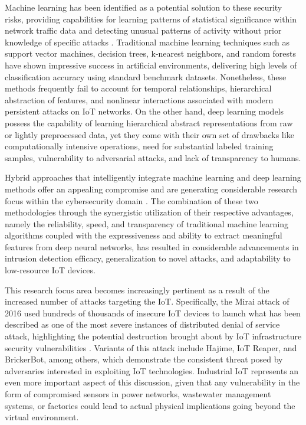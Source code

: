 \documentclass[12pt]{article}
\begin{document}
Machine learning has been identified as a potential solution to these security risks, providing capabilities for learning patterns of statistical significance within network traffic data and detecting unusual patterns of activity without prior knowledge of specific attacks \cite{hasan2019attack}. Traditional machine learning techniques such as support vector machines, decision trees, k-nearest neighbors, and random forests have shown impressive success in artificial environments, delivering high levels of classification accuracy using standard benchmark datasets. Nonetheless, these methods frequently fail to account for temporal relationships, hierarchical abstraction of features, and nonlinear interactions associated with modern persistent attacks on IoT networks. On the other hand, deep learning models possess the capability of learning hierarchical abstract representations from raw or lightly preprocessed data, yet they come with their own set of drawbacks like computationally intensive operations, need for substantial labeled training samples, vulnerability to adversarial attacks, and lack of transparency to humans.

Hybrid approaches that intelligently integrate machine learning and deep learning methods offer an appealing compromise and are generating considerable research focus within the cybersecurity domain \cite{zhang2019hybrid}. The combination of these two methodologies through the synergistic utilization of their respective advantages, namely the reliability, speed, and transparency of traditional machine learning algorithms coupled with the expressiveness and ability to extract meaningful features from deep neural networks, has resulted in considerable advancements in intrusion detection efficacy, generalization to novel attacks, and adaptability to low-resource IoT devices.

This research focus area becomes increasingly pertinent as a result of the increased number of attacks targeting the IoT. Specifically, the Mirai attack of 2016 used hundreds of thousands of insecure IoT devices to launch what has been described as one of the most severe instances of distributed denial of service attack, highlighting the potential destruction brought about by IoT infrastructure security vulnerabilities \cite{vishwakarma2020survey}. Variants of this attack include Hajime, IoT Reaper, and BrickerBot, among others, which demonstrate the consistent threat posed by adversaries interested in exploiting IoT technologies. Industrial IoT represents an even more important aspect of this discussion, given that any vulnerability in the form of compromised sensors in power networks, wastewater management systems, or factories could lead to actual physical implications going beyond the virtual environment.
\end{document}
